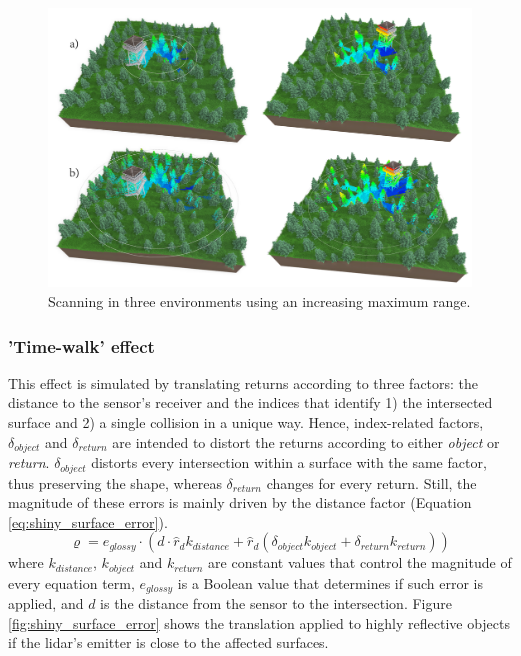 \begin{figure}[ht]
	\centering
	\includegraphics[width=\linewidth]{figs/lidar_simulation/tls_maximum_range.png}
	\caption{Scanning in three environments using an increasing maximum range.}
	\label{fig:tls_maximum_range}
\end{figure}

\subsubsection{'Time-walk' effect}

This effect is simulated by translating returns according to three factors: the distance to the sensor's receiver and the indices that identify 1) the intersected surface and 2) a single collision in a unique way. Hence, index-related factors, $\delta_{\textit{object}}$ and $\delta_{\textit{return}}$ are intended to distort the returns according to either \textit{object} or \textit{return}. $\delta_{\textit{object}}$ distorts every intersection within a surface with the same factor, thus preserving the shape, whereas $\delta_{\textit{return}}$ changes for every return. Still, the magnitude of these errors is mainly driven by the distance factor (Equation \ref{eq:shiny_surface_error}).
\begin{equation}
    \label{eq:shiny_surface_error}
    \varrho = e_{\textit{glossy}} \cdot (d \cdot \hat{r}_{d} k_{\textit{distance}} + \hat{r}_{d}(\delta_{\textit{object}}k_{\textit{object}} + \delta_{\textit{return}}k_{\textit{return}})) 
\end{equation}
where $k_{\textit{distance}}$, $k_{\textit{object}}$ and $k_{\textit{return}}$ are constant values that control the magnitude of every equation term, $e_{\textit{glossy}}$ is a Boolean value that determines if such error is applied, and $d$ is the distance from the sensor to the intersection. Figure \ref{fig:shiny_surface_error} shows the translation applied to highly reflective objects if the \acrshort{lidar}'s emitter is close to the affected surfaces.

